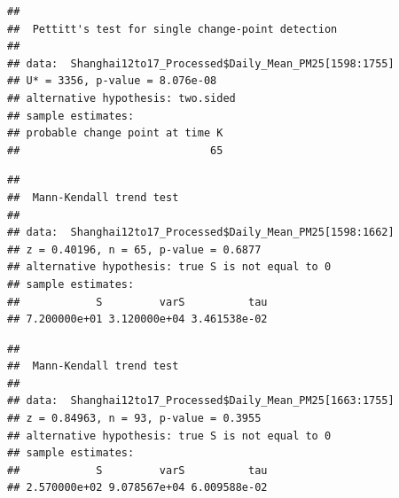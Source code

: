 \documentclass[12pt,]{article}
\newenvironment{Shaded}{\begin{snugshade}}{\end{snugshade}}
\newcommand{\KeywordTok}[1]{\textcolor[rgb]{0.13,0.29,0.53}{\textbf{#1}}}
\newcommand{\DecValTok}[1]{\textcolor[rgb]{0.00,0.00,0.81}{#1}}
\newcommand{\OperatorTok}[1]{\textcolor[rgb]{0.81,0.36,0.00}{\textbf{#1}}}
\newcommand{\NormalTok}[1]{#1}
\begin{document}
\begin{Shaded}
\end{Shaded}

\begin{verbatim}
## 
##  Pettitt's test for single change-point detection
## 
## data:  Shanghai12to17_Processed$Daily_Mean_PM25[1598:1755]
## U* = 3356, p-value = 8.076e-08
## alternative hypothesis: two.sided
## sample estimates:
## probable change point at time K 
##                              65
\end{verbatim}

\begin{Shaded}
\end{Shaded}

\begin{verbatim}
## 
##  Mann-Kendall trend test
## 
## data:  Shanghai12to17_Processed$Daily_Mean_PM25[1598:1662]
## z = 0.40196, n = 65, p-value = 0.6877
## alternative hypothesis: true S is not equal to 0
## sample estimates:
##            S         varS          tau 
## 7.200000e+01 3.120000e+04 3.461538e-02
\end{verbatim}

\begin{Shaded}
\end{Shaded}

\begin{verbatim}
## 
##  Mann-Kendall trend test
## 
## data:  Shanghai12to17_Processed$Daily_Mean_PM25[1663:1755]
## z = 0.84963, n = 93, p-value = 0.3955
## alternative hypothesis: true S is not equal to 0
## sample estimates:
##            S         varS          tau 
## 2.570000e+02 9.078567e+04 6.009588e-02
\end{verbatim}
\end{document}
